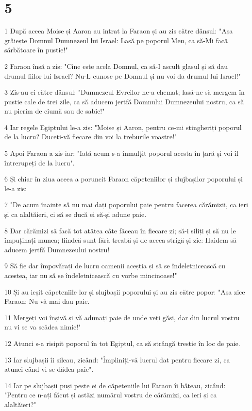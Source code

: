 \chapter{5}

\par 1 După aceea Moise și Aaron au intrat la Faraon și au zis către dânsul: "Așa grăiește Domnul Dumnezeul lui Israel: Lasă pe poporul Meu, ca să-Mi facă sărbătoare în pustie!"
\par 2 Faraon însă a zis: "Cine este acela Domnul, ca să-I ascult glasul și să dau drumul fiilor lui Israel? Nu-L cunosc pe Domnul și nu voi da drumul lui Israel!"
\par 3 Zis-au ei către dânsul: "Dumnezeul Evreilor ne-a chemat; lasă-ne să mergem în pustie cale de trei zile, ca să aducem jertfă Domnului Dumnezeului nostru, ca să nu pierim de ciumă sau de sabie!"
\par 4 Iar regele Egiptului le-a zis: "Moise și Aaron, pentru ce-mi stingheriți poporul de la lucru? Duceți-vă fiecare din voi la treburile voastre!"
\par 5 Apoi Faraon a zis iar: "Iată acum s-a înmulțit poporul acesta în țară și voi îl întrerupeți de la lucru".
\par 6 Și chiar în ziua aceea a poruncit Faraon căpeteniilor și slujbașilor poporului și le-a zis:
\par 7 "De acum înainte să nu mai dați poporului paie pentru facerea cărămizii, ca ieri și ca alaltăieri, ci să se ducă ei să-și adune paie.
\par 8 Dar cărămizi să facă tot atâtea câte făceau în fiecare zi; să-i siliți și să nu le împuținați munca; fiindcă sunt fără treabă și de aceea strigă și zic: Haidem să aducem jertfă Dumnezeului nostru!
\par 9 Să fie dar împovărați de lucru oamenii aceștia și să se îndeletnicească cu acestea, iar nu să se îndeletnicească cu vorbe mincinoase!"
\par 10 Și au ieșit căpeteniile lor și slujbașii poporului și au zis către popor: "Așa zice Faraon: Nu vă mai dau paie.
\par 11 Mergeți voi înșivă și vă adunați paie de unde veți găsi, dar din lucrul vostru nu vi se va scădea nimic!"
\par 12 Atunci s-a risipit poporul în tot Egiptul, ca să strângă trestie în loc de paie.
\par 13 Iar slujbașii îi sileau, zicând: "Împliniți-vă lucrul dat pentru fiecare zi, ca atunci când vi se dădea paie".
\par 14 Iar pe slujbașii puși peste ei de căpeteniile lui Faraon îi băteau, zicând: "Pentru ce n-ați făcut și astăzi numărul vostru de cărămizi, ca ieri și ca alaltăieri?"
